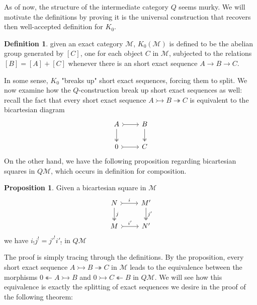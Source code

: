\documentclass{article}
\theoremstyle{definition}
\theoremstyle{definition}
\newtheorem{definition}{Definition}[theorem]
\theoremstyle{definition}
\theoremstyle{definition}
\newtheorem{proposition}{Proposition}[theorem]
\theoremstyle{definition}
\theoremstyle{definition}
\theoremstyle{definition}
\begin{document}
As of now, the structure of the intermediate category $Q$ seems murky. We will motivate the definitions by proving it is the universal construction that recovers then well-accepted definition for $K_0$.



\begin{tcolorbox}[colback=purple!5!white,colframe=purple!75!black]
\begin{definition}
    given an exact category $\mathcal{M}$, $K_0(\mathcal{M})$ is defined to be the abelian group generated by $[C]$, one for each object $C$ in $\mathcal{M}$, subjected to the relations $[B]=[A]+[C]$ whenever there is an short exact sequence $A\to B\to C$. 
\end{definition}
\end{tcolorbox}
In some sense, $K_0$ "breaks up" short exact sequences, forcing them to split. We now examine how the $Q$-construction break up short exact sequences as well: recall the fact that every short exact sequence $A\rightarrowtail B\twoheadrightarrow C$ is equivalent to the bicartesian diagram
\[\begin{tikzcd}
A\arrow[r,rightarrowtail]\arrow[d,twoheadrightarrow]& B\arrow[d,twoheadrightarrow]\\
0\arrow[r,rightarrowtail]&C
\end{tikzcd}\]
On the other hand, we have the following proposition regarding bicartesian squares in $Q\mathcal{M}$, which occurs in definition for composition.

\begin{tcolorbox}[colback=blue!5!white,colframe=blue!30!white]
\begin{proposition}
    Given a bicartesian square in $\mathcal{M}$
    \[\begin{tikzcd}
    N\arrow[r,rightarrowtail,"i"]\arrow[d,twoheadrightarrow,"j"]& M'\arrow[d,twoheadrightarrow,"j'"]\\
    M\arrow[r,rightarrowtail,"i'"]&N'
    \end{tikzcd}\]
we have $i_!j^!=j'^!i'_!$ in $Q\mathcal{M}$
\end{proposition}
\end{tcolorbox}
The proof is simply tracing through the definitions. By the proposition, every short exact sequence $A\rightarrowtail B\twoheadrightarrow C$ in $\mathcal{M}$ leads to the equivalence between the morphisms $0\twoheadleftarrow A\rightarrowtail B$ and $0 \rightarrowtail C\twoheadleftarrow B $ in $Q\mathcal{M}$. We will see how this equivalence is exactly the splitting of exact sequences we desire in the proof of the following theorem:
\end{document}
